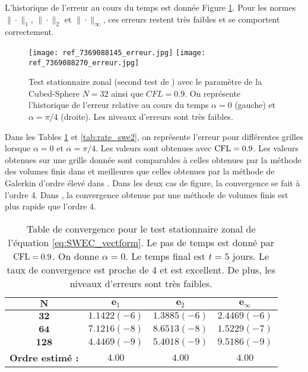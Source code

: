 L'historique de l'erreur au cours du temps est donnée Figure \ref{fig: williamson 2 erreur}. Pour les normes $\| \cdot \|_1$, $\| \cdot \|_2$ et $\| \cdot \|_{\infty}$, ces erreurs restent très faibles et se comportent correctement.

\begin{figure}[htbp]
\begin{center}
\texttt{[image: ref\_7369088145\_erreur.jpg]}
\texttt{[image: ref\_7369088270\_erreur.jpg]}
\end{center}
\caption{Test stationnaire zonal (second test de \cite{Williamson1992}) avec le paramètre de la Cubed-Sphere $N=32$ ainsi que $CFL=0.9$. On représente l'historique de l'erreur relative au cours du temps $\alpha = 0$ (gauche) et $\alpha = \pi/4$ (droite). Les niveaux d'erreurs sont très faibles.}
\label{fig: williamson 2 erreur}
\end{figure}

Dans les Tables \ref{tab:rate_swe1} et \ref{tab:rate_swe2}, on représente l'erreur pour différentes grilles lorsque $\alpha = 0$ et $\alpha = \pi/4$. Les valeurs sont obtenues avec $\text{CFL} = 0.9$. Les valeurs obtenues sur une grille donnée sont comparables à celles obtenues par la méthode des volumes finis dans \cite{Chen2008} et meilleures que celles obtenues par la méthode de Galerkin d'ordre élevé dans \cite{Kuang2016}. Dans les deux cas de figure, la convergence se fait à l'ordre 4. Dans \cite{Ullrich2011}, la convergence obtenue par une méthode de volumes finis est plus rapide que l'ordre 4. 

\begin{table}[htbp]
\begin{center}
\begin{tabular}{|c||c|c|c|}
\hline 
$\mathbf{N}$ & $\mathbf{e}_1$ & $\mathbf{e}_2$ & $\mathbf{e}_{\infty}$\\ 
\hline 
\hline 
$\mathbf{32}$ & $1.1422(-6)$ & $1.3885(-6)$ & $2.4469(-6)$\\ 

$\mathbf{64}$ & $7.1216(-8)$ & $8.6513(-8)$ & $1.5229(-7)$\\ 

$\mathbf{128}$ & $4.4469(-9)$ & $5.4018(-9)$ & $9.5186(-9)$\\

\hline
\textbf{Ordre estimé :} & $4.00$ & $4.00$ & $4.00$\\ 
\hline
\end{tabular} 
\end{center}
\caption{Table de convergence pour le test stationnaire zonal de l'équation \eqref{eq:SWEC_vectform}. Le pas de temps est donné par $\text{CFL}=0.9$. On donne $\alpha = 0$. Le temps final est $t=5$ jours. Le taux de convergence est proche de 4 et est excellent. De plus, les niveaux d'erreurs sont très faibles.}
\label{tab:rate_swe1}
\end{table}

